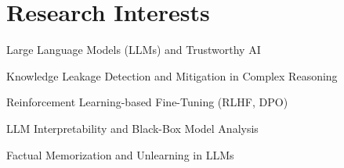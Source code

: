 \section{Research Interests}
\begin{description}[font=$\bullet$]
\item Large Language Models (LLMs) and Trustworthy AI\vspace{-5pt}
\item Knowledge Leakage Detection and Mitigation in Complex Reasoning\vspace{-5pt}
\item Reinforcement Learning-based Fine-Tuning (RLHF, DPO)\vspace{-5pt}
\item LLM Interpretability and Black-Box Model Analysis\vspace{-5pt}
\item Factual Memorization and Unlearning in LLMs\vspace{-5pt}
\end{description}
\vspace{0.5pt}